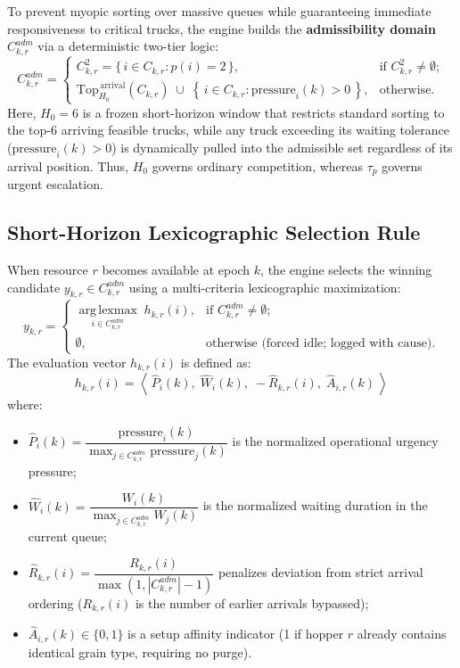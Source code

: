 \documentclass[11pt,a4paper]{article}
\begin{document}
To prevent myopic sorting over massive queues while guaranteeing immediate responsiveness to critical trucks, the engine builds the \textbf{admissibility domain} $C^{adm}_{k,r}$ via a deterministic two-tier logic:
\begin{equation}
  C^{adm}_{k,r} =
  \begin{cases}
    C^{2}_{k,r} = \{\, i \in C_{k,r} : p(i) = 2 \,\}, & \text{if } C^{2}_{k,r} \neq \emptyset; \\[4pt]
    \mathrm{Top}^{\,\text{arrival}}_{H_0}(C_{k,r}) \;\cup\; \left\{\, i \in C_{k,r} : \mathrm{pressure}_i(k) > 0 \,\right\}, & \text{otherwise.}
  \end{cases}
  \label{eq:cadm}
\end{equation}
Here, $H_0 = 6$ is a frozen short-horizon window that restricts standard sorting to the top-6 arriving feasible trucks, while any truck exceeding its waiting tolerance ($\mathrm{pressure}_i(k) > 0$) is dynamically pulled into the admissible set regardless of its arrival position. Thus, $H_0$ governs ordinary competition, whereas $\tau_p$ governs urgent escalation.

\subsection{Short-Horizon Lexicographic Selection Rule}
When resource $r$ becomes available at epoch $k$, the engine selects the winning candidate $y_{k,r} \in C^{adm}_{k,r}$ using a multi-criteria lexicographic maximization:
\begin{equation}
  y_{k,r} =
  \begin{cases}
    \displaystyle \operatorname*{arg\,lexmax}_{i \in C^{adm}_{k,r}} \; h_{k,r}(i), & \text{if } C^{adm}_{k,r} \neq \emptyset; \\[6pt]
    \emptyset, & \text{otherwise (forced idle; logged with cause).}
  \end{cases}
  \label{eq:lexmax}
\end{equation}
The evaluation vector $h_{k,r}(i)$ is defined as:
\begin{equation}
  h_{k,r}(i) = \left\langle\, \hat{P}_i(k),\; \hat{W}_i(k),\; -\hat{R}_{k,r}(i),\; \hat{A}_{i,r}(k) \,\right\rangle
\end{equation}
where:
\begin{itemize}[leftmargin=1.2cm,itemsep=0pt,topsep=2pt]
  \item $\hat{P}_i(k) = \dfrac{\mathrm{pressure}_i(k)}{\max_{j \in C^{adm}_{k,r}} \mathrm{pressure}_j(k)}$ is the normalized operational urgency pressure;
  \item $\hat{W}_i(k) = \dfrac{W_i(k)}{\max_{j \in C^{adm}_{k,r}} W_j(k)}$ is the normalized waiting duration in the current queue;
  \item $\hat{R}_{k,r}(i) = \dfrac{R_{k,r}(i)}{\max(1, |C^{adm}_{k,r}| - 1)}$ penalizes deviation from strict arrival ordering ($R_{k,r}(i)$ is the number of earlier arrivals bypassed);
  \item $\hat{A}_{i,r}(k) \in \{0, 1\}$ is a setup affinity indicator (1 if hopper $r$ already contains identical grain type, requiring no purge).
\end{itemize}
\end{document}
